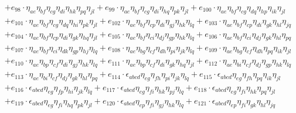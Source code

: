 \begin{itemize}
{\begin{minipage}[t]{\linewidth}
\begin{align}
    & + e_{98} \cdot \eta_{a e} \eta_{b f} \eta_{c g} \eta_{d i} \eta_{h k} \eta_{p q} \eta_{j l} + e_{99} \cdot \eta_{a e} \eta_{b f} \eta_{c g} \eta_{d i} \eta_{h q} \eta_{p k} \eta_{j l} + e_{100} \cdot \eta_{a e} \eta_{b f} \eta_{c g} \eta_{d q} \eta_{h p} \eta_{i k} \eta_{j l} \nonumber \\
    & + e_{101} \cdot \eta_{a e} \eta_{b f} \eta_{c g} \eta_{d q} \eta_{h i} \eta_{p k} \eta_{j l} + e_{102} \cdot \eta_{a e} \eta_{b f} \eta_{c p} \eta_{d i} \eta_{g j} \eta_{h k} \eta_{l q} + e_{103} \cdot \eta_{a e} \eta_{b f} \eta_{c p} \eta_{d i} \eta_{g k} \eta_{h l} \eta_{j q} \nonumber \\
    & + e_{104} \cdot \eta_{a e} \eta_{b f} \eta_{c p} \eta_{d i} \eta_{g k} \eta_{h q} \eta_{j l} + e_{105} \cdot \eta_{a e} \eta_{b f} \eta_{c i} \eta_{d j} \eta_{g p} \eta_{h k} \eta_{l q} + e_{106} \cdot \eta_{a e} \eta_{b f} \eta_{c i} \eta_{d j} \eta_{g k} \eta_{h l} \eta_{p q} \nonumber \\
    & + e_{107} \cdot \eta_{a e} \eta_{b f} \eta_{c i} \eta_{d k} \eta_{g p} \eta_{h j} \eta_{l q} + e_{108} \cdot \eta_{a e} \eta_{b g} \eta_{c f} \eta_{d h} \eta_{p i} \eta_{j k} \eta_{l q} + e_{109} \cdot \eta_{a e} \eta_{b g} \eta_{c f} \eta_{d h} \eta_{p q} \eta_{i k} \eta_{j l} \nonumber \\
    & + e_{110} \cdot \eta_{a e} \eta_{b p} \eta_{c f} \eta_{d i} \eta_{g j} \eta_{h k} \eta_{l q} + e_{111} \cdot \eta_{a e} \eta_{b p} \eta_{c f} \eta_{d i} \eta_{g k} \eta_{h q} \eta_{j l} + e_{112} \cdot \eta_{a e} \eta_{b i} \eta_{c f} \eta_{d j} \eta_{g p} \eta_{h k} \eta_{l q} \nonumber \\
    & + e_{113} \cdot \eta_{a e} \eta_{b i} \eta_{c f} \eta_{d j} \eta_{g k} \eta_{h l} \eta_{p q} + e_{114} \cdot \epsilon_{a b c d} \eta_{e g} \eta_{f h} \eta_{p i} \eta_{j k} \eta_{l q} + e_{115} \cdot \epsilon_{a b c d} \eta_{e g} \eta_{f h} \eta_{p q} \eta_{i k} \eta_{j l} \nonumber \\
    & + e_{116} \cdot \epsilon_{a b c d} \eta_{e g} \eta_{f p} \eta_{h i} \eta_{j k} \eta_{l q} + e_{117} \cdot \epsilon_{a b c d} \eta_{e g} \eta_{f i} \eta_{h k} \eta_{p j} \eta_{l q} + e_{118} \cdot \epsilon_{a b c d} \eta_{e g} \eta_{f i} \eta_{h k} \eta_{p q} \eta_{j l} \nonumber \\
    & + e_{119} \cdot \epsilon_{a b c d} \eta_{e g} \eta_{f i} \eta_{h q} \eta_{p k} \eta_{j l} + e_{120} \cdot \epsilon_{a b c d} \eta_{e p} \eta_{f i} \eta_{g j} \eta_{h k} \eta_{l q} + e_{121} \cdot \epsilon_{a b c d} \eta_{e p} \eta_{f i} \eta_{g k} \eta_{h l} \eta_{j q} \nonumber \\

\end{align}
\end{minipage}}
\end{itemize}
